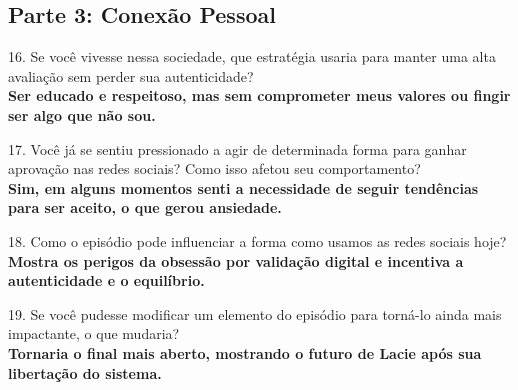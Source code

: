 \documentclass[11pt]{article}
\begin{document}
\begin{multicols}{2}
\section*{Parte 3: Conex\~ao Pessoal}

16. Se você vivesse nessa sociedade, que estratégia usaria para manter uma alta avaliação sem perder sua autenticidade?\\
\textbf{Ser educado e respeitoso, mas sem comprometer meus valores ou fingir ser algo que não sou.}

17. Você já se sentiu pressionado a agir de determinada forma para ganhar aprovação nas redes sociais? Como isso afetou seu comportamento?\\
\textbf{Sim, em alguns momentos senti a necessidade de seguir tendências para ser aceito, o que gerou ansiedade.}

18. Como o episódio pode influenciar a forma como usamos as redes sociais hoje?\\
\textbf{Mostra os perigos da obsessão por validação digital e incentiva a autenticidade e o equilíbrio.}

19. Se você pudesse modificar um elemento do episódio para torná-lo ainda mais impactante, o que mudaria?\\
\textbf{Tornaria o final mais aberto, mostrando o futuro de Lacie após sua libertação do sistema.}

\end{multicols}
\end{document}

